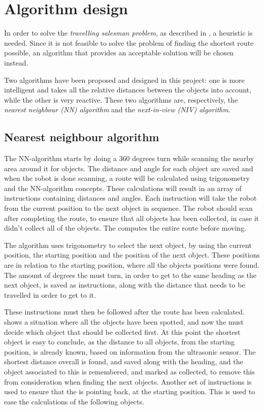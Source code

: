 \section{Algorithm design} \label{sec:algorithm-design}

In order to solve the \emph{travelling salesman problem}, as described in , a heuristic is needed. Since it is not feasible to solve the problem of finding the shortest route possible, an algorithm that provides an acceptable solution will be chosen instead.

Two algorithms have been proposed and designed in this project: one is more intelligent and takes all the relative distances between the objects into account, while the other is very reactive. These two algorithms are, respectively, the \emph{nearest neighbour (NN) algorithm} and the \emph{next-in-view (NIV) algorithm}.


\subsection{Nearest neighbour algorithm} \label{sec:nn-algorithm}
The NN-algorithm starts by doing a 360 degrees turn while scanning the nearby area around it for objects. The distance and angle for each object are saved and when the robot is done scanning, a route will be calculated using trigonometry and the NN-algorithm concepts. These calculations will result in an array of instructions containing distances and angles. Each instruction will take the robot from the current position to the next object in sequence. The robot should scan after completing the route, to ensure that all objects has been collected, in case it didn't collect all of the objects. The \projname{} computes the entire route before moving.

The algorithm uses trigonometry to select the next object, by using the current position, the starting position and the position of the next object. These positions are in relation to the starting position, where all the objects positions were found. The amount of degrees the \projname{} must turn, in order to get to the same heading as the next object, is saved as instructions, along with the distance that needs to be travelled in order to get to it. 

These instructions must then be followed after the route has been calculated.  shows a situation where all the objects have been spotted, and now the \projname{} must decide which object that should be collected first. At this point the shortest object is easy to conclude, as the distance to all objects, from the starting position, is already known, based on information from the ultrasonic sensor. The shortest distance overall is found, and saved along with the heading, and the object associated to this is remembered, and marked as collected, to remove this from consideration when finding the next objects. Another set of instructions is used to ensure that the \projname{} is pointing back, at the starting position. This is used to ease the calculations of the following objects. 

